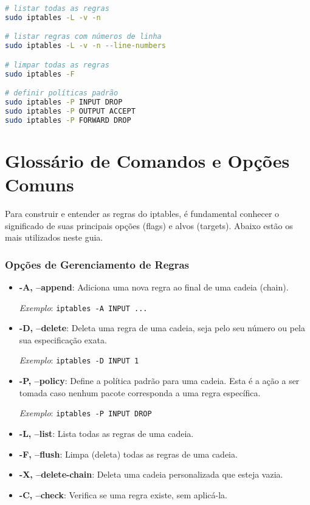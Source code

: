 ﻿\documentclass[12pt,fleqn]{article}
\begin{document}
\begin{lstlisting}[language=bash, caption=Comandos básicos do iptables]
# listar todas as regras
sudo iptables -L -v -n

# listar regras com números de linha
sudo iptables -L -v -n --line-numbers

# limpar todas as regras
sudo iptables -F

# definir políticas padrão
sudo iptables -P INPUT DROP
sudo iptables -P OUTPUT ACCEPT
sudo iptables -P FORWARD DROP
\end{lstlisting}

\section{Glossário de Comandos e Opções Comuns}

Para construir e entender as regras do iptables, é fundamental conhecer o significado de suas principais opções (flags) e alvos (targets). Abaixo estão os mais utilizados neste guia.

\subsubsection{Opções de Gerenciamento de Regras}

\begin{itemize}
    \item \textbf{-A, --append}: Adiciona uma nova regra ao final de uma cadeia (chain).
    
    \textit{Exemplo}: \texttt{iptables -A INPUT ...}
    
    \item \textbf{-D, --delete}: Deleta uma regra de uma cadeia, seja pelo seu número ou pela sua especificação exata.
    
    \textit{Exemplo}: \texttt{iptables -D INPUT 1}
    
    \item \textbf{-P, --policy}: Define a política padrão para uma cadeia. Esta é a ação a ser tomada caso nenhum pacote corresponda a uma regra específica.
    
    \textit{Exemplo}: \texttt{iptables -P INPUT DROP}
    
    \item \textbf{-L, --list}: Lista todas as regras de uma cadeia.
    
    \item \textbf{-F, --flush}: Limpa (deleta) todas as regras de uma cadeia.
    
    \item \textbf{-X, --delete-chain}: Deleta uma cadeia personalizada que esteja vazia.
    
    \item \textbf{-C, --check}: Verifica se uma regra existe, sem aplicá-la.
\end{itemize}
\end{document}
